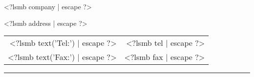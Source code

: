 \parbox{\textwidth}{%
  \parbox[b]{.42\textwidth}{%
    <?lsmb company | escape ?>
   
    <?lsmb address | escape ?>
  }
  \parbox[b]{.2\textwidth}{
  }\hfill
  \begin{tabular}[b]{rr@{}}
  <?lsmb text('Tel:') | escape ?> & <?lsmb tel | escape ?>\\
  <?lsmb text('Fax:') | escape ?> & <?lsmb fax | escape ?>
  \end{tabular}

  \rule[1.5em]{\textwidth}{0.5pt}
}

